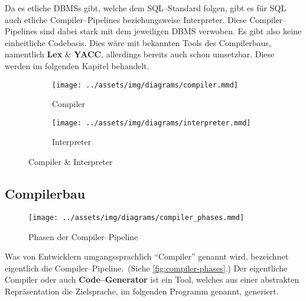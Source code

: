 Da es etliche \acp{DBMS} gibt, welche dem \ac{SQL}--Standard folgen, gibt es für \ac{SQL} auch etliche Compiler--Pipelines beziehungsweise Interpreter.
Diese Compiler--Pipelines sind dabei stark mit dem jeweiligen \ac{DBMS} verwoben.
Es gibt also keine einheitliche Codebasis.
Dies wäre mit bekannten Tools des Compilerbaus, namentlich \textbf{Lex} \& \textbf{YACC}, allerdings bereits auch schon umsetzbar.
Diese werden im folgenden Kapitel behandelt.

\begin{figure}[ht]
    \begin{subfigure}[c]{0.5\textwidth}
        \begin{center}
            \texttt{[image: ../assets/img/diagrams/compiler.mmd]}
        \end{center}
        \caption{Compiler}
        \label{subfig:compiler-and-interpreter-compiler}
    \end{subfigure}
    \begin{subfigure}[c]{0.5\textwidth}
        \begin{center}
            \texttt{[image: ../assets/img/diagrams/interpreter.mmd]}
        \end{center}
        \caption{Interpreter}
        \label{subfig:compiler-and-interpreter-interpreter}
    \end{subfigure}
    \caption{Compiler \& Interpreter~\autocite{aho-2006}}
    \label{fig:compiler-and-interpreter}
\end{figure}
\newpage

\subsection{Compilerbau}\label{subsec:compilerbau}
\begin{wrapfigure}{rH}{0.35\textwidth}
    \begin{center}
        \texttt{[image: ../assets/img/diagrams/compiler\_phases.mmd]}
    \end{center}
    \caption{Phasen der Compiler--Pipeline~\autocite{aho-2006}}
    \label{fig:compiler-phases}
\end{wrapfigure}
Was von Entwicklern umgangssprachlich \enquote{Compiler} genannt wird, bezeichnet eigentlich die Compiler--Pipeline.~(Siehe \autoref{fig:compiler-phases}.)
Der eigentliche Compiler oder auch \textbf{Code--Generator} ist ein Tool, welches aus einer abstrakten Repräsentation die Zielsprache, im folgenden Programm genannt, generiert.

